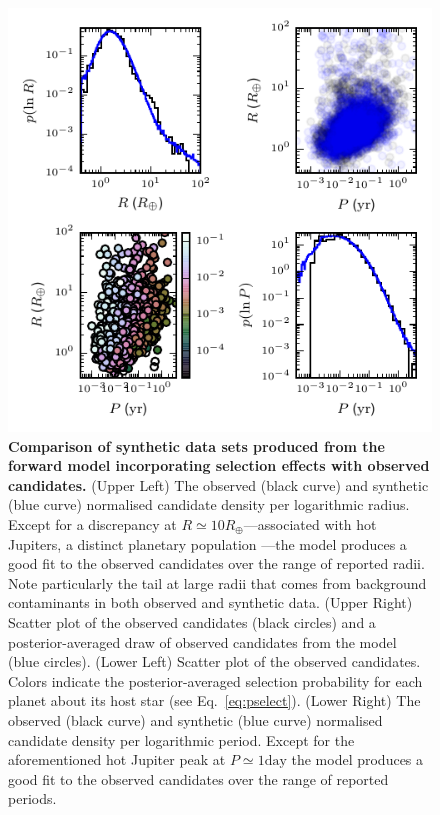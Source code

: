 \documentclass[apjl]{emulateapj}
\newcommand{\REarth}{R_\oplus}
\begin{document}
\begin{figure}
  \includegraphics[width=\columnwidth]{selection}
  \caption{\label{fig:selection} \textbf{Comparison of synthetic data
      sets produced from the forward model incorporating selection
      effects with observed candidates.}  (Upper Left) The observed
    (black curve) and synthetic (blue curve) normalised candidate
    density per logarithmic radius.  Except for a discrepancy at $R
    \simeq 10 \REarth$---associated with hot Jupiters, a distinct
    planetary population \citep{Albrecht2012,Naoz2012}---the model
    produces a good fit to the observed candidates over the range of
    reported radii.  Note particularly the tail at large radii that
    comes from background contaminants in both observed and synthetic
    data.  (Upper Right) Scatter plot of the observed candidates
    (black circles) and a posterior-averaged draw of observed
    candidates from the model (blue circles).  (Lower Left) Scatter
    plot of the observed candidates.  Colors indicate the
    posterior-averaged selection probability for each planet about its
    host star (see Eq.\ \eqref{eq:pselect}).  (Lower Right) The
    observed (black curve) and synthetic (blue curve) normalised
    candidate density per logarithmic period.  Except for the
    aforementioned hot Jupiter peak at $P \simeq 1 \mathrm{day}$ the
    model produces a good fit to the observed candidates over the
    range of reported periods.}
\end{figure}
\end{document}
